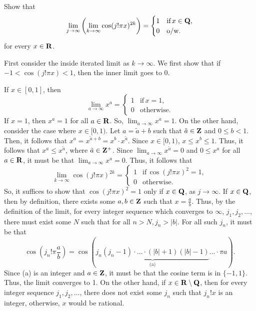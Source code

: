 \documentclass[11pt,oneside]{book}
\begin{document}
\begin{exercise}
    Show that 
    \[
    \lim_{j\to\infty}\left(\lim_{k\to\infty} \cos(j!\pi x)^{2k}\right) = \begin{cases}1 &\text{if}\,x\in\mathbf{Q}, \\ 0 &\text{o/w.}\end{cases}
    \]
    for every $x \in \mathbf{R}$.
\end{exercise}
\begin{solution}
    First consider the inside iterated limit as $k\to \infty$. We
    first show that if $-1 < \cos(j!\pi x) < 1$, then the inner limit goes to 0.
    
        If $x \in [0,1]$, then 
        \[
            \lim_{a \to \infty} x^a = \begin{cases}1 &\text{if}\,x =1, \\ 0 &\text{otherwise.}\end{cases}
        \]
        If $x=1$, then $x^a = 1$ for all $a \in \mathbf{R}$. So, $\lim_{a \to \infty}
        x^a = 1$. On the other hand, consider the case where $x \in [0,1)$. Let
        $a = \tilde a + b$ such that $\tilde a \in \mathbf{Z}$ and $0 \leq b < 1$. Then,
        it follows that $x^a = x^{\tilde a + b} = x^b \cdot x^{\tilde a }$.
        Since $x \in [0,1)$, $x \leq  x^b \leq 1$. Thus, it follows that $x^a
        \leq x^{\tilde a}$, where $\tilde a \in \mathbf{Z}^+$. Since $\lim_{a \to
        \infty} x^{\tilde a} = 0$ and $0 \leq x^a$ for all $a \in \mathbf{R}$, it must
        be that $\lim_{a\to\infty} x^a = 0$. 
    Thus, it follows that 
    \[
        \lim_{k\to\infty} \cos(j!\pi x)^{2k} = \begin{cases}1 &\text{if}\, \cos(j!\pi x)^{2} = 1, \\ 0 &\text{otherwise.}\end{cases}
    \]
    So, it suffices to show that $\cos(j!\pi x)^2 = 1$ only if $x \in \mathbf{Q}$, as
    $j\to \infty$. If $x\in \mathbf{Q}$, then by definition, there exists some $a,b\in
    \mathbf{Z}$ such that $x = \frac{a}{b}$. Thus, by the definition of the limit, for
    every integer sequence which converges to $\infty$, $j_1,j_2,\ldots$, there
    must exist some $N$ such that for all $n > N, j_n > |b|$. For all such
    $j_n$, it must be that 
    \[\cos\left(j_n!\pi \frac{a}{b}\right) = \cos(\underbrace{j_n(j_n-1)\cdot
    \ldots \cdot(|b|+1)(|b|-1)}_{\text{(a)}}\ldots \cdot \pi a).\] Since (a) is
    an integer and $a \in \mathbf{Z}$, it must be that the cosine term is in $\{-1,1\}$.
    Thus, the limit converges to 1. On the other hand, if $x \in \mathbf{R} \setminus
    \mathbf{Q}$, then for every integer sequence $j_1,j_2,\ldots$, there does not exist
    some $j_n$ such that $j_n! x$ is an integer, otherwise, $x$ would be
    rational. 
\end{solution}
\end{document}
